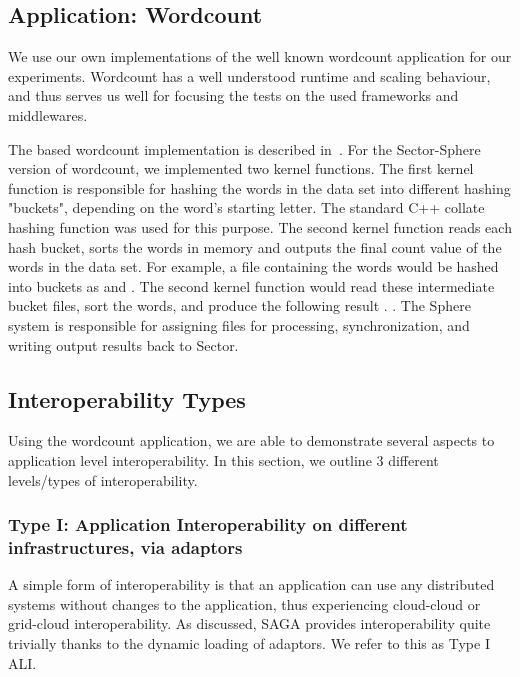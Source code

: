 \documentclass[3p,twocolumn]{elsarticle}
\begin{document}
\subsection{Application: Wordcount}
\label{ssec:app}

We use our own implementations of the well known wordcount application
for our experiments.  Wordcount has a well understood runtime and
scaling behaviour, and thus serves us well for focusing the tests on
the used frameworks and middlewares.

The \mr based wordcount implementation is described
in~\cite{saga_ccgrid09}.  For the Sector-Sphere version of wordcount,
we implemented two kernel functions. The first kernel function is
responsible for hashing the words in the data set into different
hashing "buckets", depending on the word's starting letter.  The
standard C++ collate hashing function was used for this purpose.  The
second kernel function reads each hash bucket, sorts the words in
memory and outputs the final count value of the words in the data set.
For example, a file containing the words  would be hashed into buckets as  and
.  The second kernel function would read these
intermediate bucket files, sort the words, and produce the following
result .  .  The Sphere system is
responsible for assigning files for processing, synchronization, and
writing output results back to Sector.


\subsection{Interoperability Types}

Using the wordcount application, we are able to demonstrate several
aspects to application level interoperability. In this section, we
outline 3 different levels/types of interoperability.


\subsubsection{Type I: Application Interoperability on different
  infrastructures, via adaptors}
%
%
A simple form of interoperability is that an application can use any
distributed systems without changes to the application, thus
experiencing cloud-cloud or grid-cloud interoperability.  As
discussed, SAGA provides interoperability quite trivially thanks to
the dynamic loading of adaptors.  We refer to this as Type I ALI.
\end{document}
